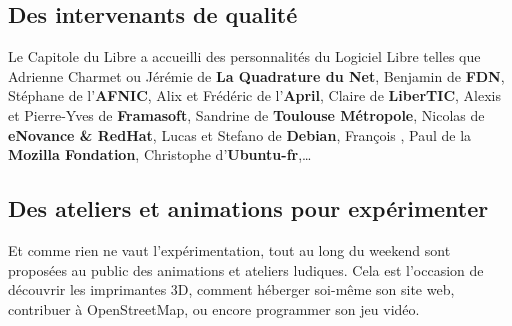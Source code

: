 \subsection{Des intervenants de qualité}

Le Capitole du Libre a accueilli des personnalités du Logiciel Libre 
telles que Adrienne Charmet ou Jérémie  de \textbf{La 
Quadrature du Net}, Benjamin  de \textbf{FDN}, Stéphane 
 de l'\textbf{AFNIC}, Alix  et Frédéric 
 de l'\textbf{April}, Claire  de 
\textbf{LiberTIC}, Alexis  et Pierre-Yves  
de \textbf{Framasoft}, Sandrine  de \textbf{Toulouse 
Métropole}, Nicolas  de \textbf{eNovance \& RedHat}, Lucas 
 et Stefano  de \textbf{Debian}, 
François , Paul  de la \textbf{Mozilla 
Fondation}, Christophe  d'\textbf{Ubuntu-fr},\dots

\subsection{Des ateliers et animations pour expérimenter}


Et comme rien ne vaut l'expérimentation, tout au long du weekend sont 
proposées au public des animations et ateliers ludiques. Cela est 
l'occasion de découvrir les imprimantes 3D, comment héberger soi-même son 
site web, contribuer à OpenStreetMap, ou encore programmer son jeu vidéo.
